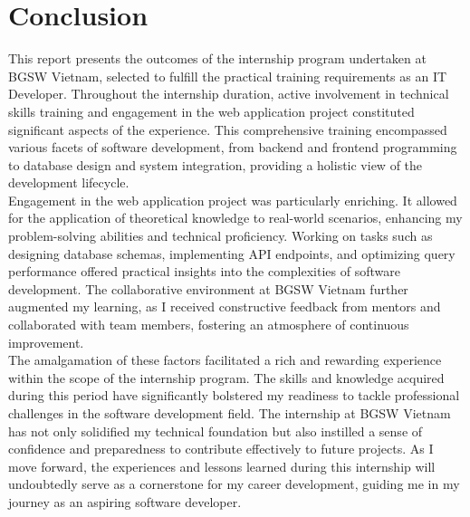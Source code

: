 \section{Conclusion}

This report presents the outcomes of the internship program undertaken at BGSW Vietnam, selected to fulfill the practical training requirements as an IT Developer. Throughout the internship duration, active involvement in technical skills training and engagement in the web application project constituted significant aspects of the experience. This comprehensive training encompassed various facets of software development, from backend and frontend programming to database design and system integration, providing a holistic view of the development lifecycle. \\

\noindent Engagement in the web application project was particularly enriching. It allowed for the application of theoretical knowledge to real-world scenarios, enhancing my problem-solving abilities and technical proficiency. Working on tasks such as designing database schemas, implementing API endpoints, and optimizing query performance offered practical insights into the complexities of software development. The collaborative environment at BGSW Vietnam further augmented my learning, as I received constructive feedback from mentors and collaborated with team members, fostering an atmosphere of continuous improvement. \\

\noindent The amalgamation of these factors facilitated a rich and rewarding experience within the scope of the internship program. The skills and knowledge acquired during this period have significantly bolstered my readiness to tackle professional challenges in the software development field. The internship at BGSW Vietnam has not only solidified my technical foundation but also instilled a sense of confidence and preparedness to contribute effectively to future projects. As I move forward, the experiences and lessons learned during this internship will undoubtedly serve as a cornerstone for my career development, guiding me in my journey as an aspiring software developer.